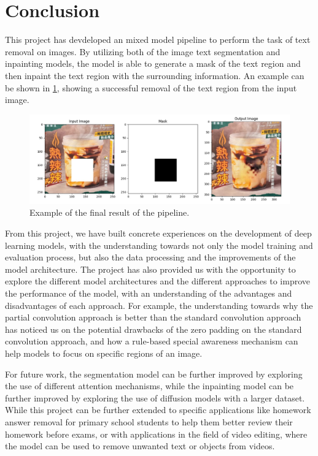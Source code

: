 \documentclass[10pt,twocolumn,letterpaper]{article}
\begin{document}
\section{Conclusion}

This project has devdeloped an mixed model pipeline to perform the task of text removal on images. By utilizing both of the image text segmentation and inpainting models,
the model is able to generate a mask of the text region and then inpaint the text region with the surrounding information. An example can be shown in \cref{fig:final_result},
showing a successful removal of the text region from the input image.

\begin{figure}[t]
    \centering
    \includegraphics[width=\linewidth]{figures/milestone/final_result.jpg}
    \caption{Example of the final result of the pipeline.}
    \label{fig:final_result}
\end{figure}

From this project, we have built concrete experiences on the development of deep learning models, with the understanding towards not only the model training and evaluation process, but also the 
data processing and the improvements of the model architecture. The project has also provided us with the opportunity to explore the different model architectures and the different approaches to 
improve the performance of the model, with an understanding of the advantages and disadvantages of each approach. For example, the understanding towards why the partial convolution approach is
better than the standard convolution approach has noticed us on the potential drawbacks of the zero padding on the standard convolution approach, and how a rule-based special awareness mechanism can help
models to focus on specific regions of an image.

For future work, the segmentation model can be further improved by exploring the use of different attention mechanisms, while the inpainting model can be further improved by exploring the use of 
diffusion models with a larger dataset. While this project can be further extended to specific applications like homework answer removal for primary school students to help them better review their homework
before exams, or with applications in the field of video editing, where the model can be used to remove unwanted text or objects from videos.
\end{document}
